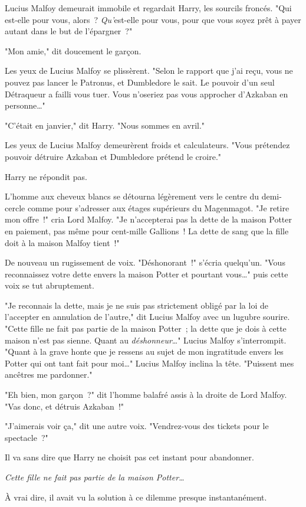 Lucius Malfoy demeurait immobile et regardait Harry, les sourcils froncés. "Qui est-elle pour vous, alors~? \emph{Qu'}est-elle pour vous, pour que vous soyez prêt à payer autant dans le but de l'épargner~?"

"Mon amie," dit doucement le garçon.

Les yeux de Lucius Malfoy se plissèrent. "Selon le rapport que j'ai reçu, vous ne pouvez pas lancer le Patronus, et Dumbledore le sait. Le pouvoir d'un seul Détraqueur a failli vous tuer. Vous n'oseriez pas vous approcher d'Azkaban en personne…"

"C'était en janvier," dit Harry. "Nous sommes en avril."

Les yeux de Lucius Malfoy demeurèrent froids et calculateurs. "Vous prétendez pouvoir détruire Azkaban et Dumbledore prétend le croire."

Harry ne répondit pas.

L'homme aux cheveux blancs se détourna légèrement vers le centre du demi-cercle comme pour s'adresser aux étages supérieurs du Magenmagot. "Je retire mon offre~!" cria Lord Malfoy. "Je n'accepterai pas la dette de la maison Potter en paiement, pas même pour cent-mille Gallions~! La dette de sang que la fille doit à la maison Malfoy tient~!"

De nouveau un rugissement de voix. "Déshonorant~!" s'écria quelqu'un. "Vous reconnaissez votre dette envers la maison Potter et pourtant vous…" puis cette voix se tut abruptement.

"Je reconnais la dette, mais je ne suis pas strictement obligé par la loi de l'accepter en annulation de l'autre," dit Lucius Malfoy avec un lugubre sourire. "Cette fille ne fait pas partie de la maison Potter~; la dette que je dois à cette maison n'est pas sienne. Quant au \emph{déshonneur}…" Lucius Malfoy s'interrompit. "Quant à la grave honte que je ressens au sujet de mon ingratitude envers les Potter qui ont tant fait pour moi…" Lucius Malfoy inclina la tête. "Puissent mes ancêtres me pardonner."

"Eh bien, mon garçon~?" dit l'homme balafré assis à la droite de Lord Malfoy. "Vas donc, et détruis Azkaban~!"

"J'aimerais voir ça," dit une autre voix. "Vendrez-vous des tickets pour le spectacle~?"

Il va sans dire que Harry ne choisit pas cet instant pour abandonner.

\emph{Cette fille ne fait pas partie de la maison Potter…}

À vrai dire, il avait vu la solution à ce dilemme presque instantanément.

